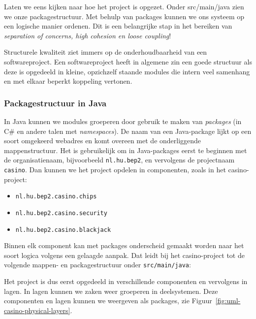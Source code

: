 Laten we eens kijken naar hoe het project is opgezet.
Onder src/main/java zien we onze packagestructuur.
Met behulp van packages kunnen we ons systeem op een logische manier 
ordenen. Dit is een belangrijke stap in het bereiken van 
\textit{separation of concerns, high cohesion en loose coupling}!

Structurele kwaliteit ziet immers op de onderhoudbaarheid
van een softwareproject. Een softwareproject heeft in algemene zin 
een goede structuur als deze is opgedeeld in kleine,
opzichzelf staande modules die intern veel samenhang 
en met elkaar beperkt koppeling vertonen.

\newpage
\subsubsection{Packagestructuur in Java}
In Java kunnen we modules groeperen door gebruik te maken van 
\emph{packages} (in C\# en andere talen met \emph{namespaces}).
De naam van een Java-package lijkt op een soort omgekeerd webadres
en komt overeen met de onderliggende mappenstructuur.
Het is gebruikelijk om in Java-packages eerst te beginnen met de organisatienaam,
bijvoorbeeld \texttt{nl.hu.bep2}, en vervolgens de projectnaam \texttt{casino}.
Dan kunnen we het project opdelen in componenten, zoals in het casino-project: 
\begin{itemize}
\item \texttt{nl.hu.bep2.casino.chips}
\item \texttt{nl.hu.bep2.casino.security}
\item \texttt{nl.hu.bep2.casino.blackjack}
\end{itemize}

Binnen elk component kan met packages 
onderscheid gemaakt worden naar het soort logica volgens een gelaagde aanpak. 
Dat leidt bij het casino-project tot de volgende 
mappen- en packagestructuur onder \texttt{src/main/java}:


Het project is dus eerst opgedeeld in verschillende componenten en vervolgens in 
lagen. In lagen kunnen we zaken weer groeperen in deelsystemen. Deze componenten 
en lagen kunnen we weergeven als packages, zie Figuur~\ref{fig:uml-casino-physical-layers}.


